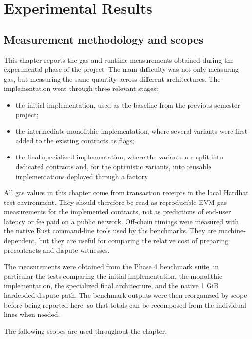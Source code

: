 \chapter{Experimental Results}
\label{chap:experimental-results}

\section{Measurement methodology and scopes}

This chapter reports the gas and runtime measurements obtained during the experimental
phase of the project. The main difficulty was not only measuring gas, but measuring the
same quantity across different architectures. The implementation went through three
relevant stages:

\begin{itemize}
  \item the initial implementation, used as the baseline from the previous semester
  project;
  \item the intermediate monolithic implementation, where several variants were first added to
  the existing contracts as flags;
  \item the final specialized implementation, where the variants are split into dedicated
  contracts and, for the optimistic variants, into reusable implementations deployed through
  a factory.
\end{itemize}

All gas values in this chapter come from transaction receipts in the local Hardhat test
environment. They should therefore be read as reproducible EVM gas measurements for the
implemented contracts, not as predictions of end-user latency or fee paid on a public
network. Off-chain timings were measured with the native Rust command-line tools used by
the benchmarks. They are machine-dependent, but they are useful for comparing the relative
cost of preparing precontracts and dispute witnesses.

The measurements were obtained from the Phase 4 benchmark suite, in particular the tests
comparing the initial implementation, the monolithic implementation, the specialized final
architecture, and the native 1 GiB hardcoded dispute path. The benchmark outputs were then
reorganized by scope before being reported here, so that totals can be recomposed from the
individual lines when needed.

The following scopes are used throughout the chapter.

